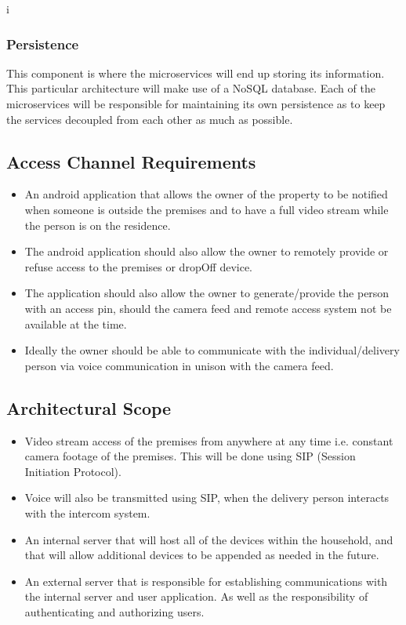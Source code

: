 i\documentclass[a4paper,12pt]{article}
\begin{document}
	\subsubsection{Persistence}
	This component is where the microservices will end up storing its information. This particular architecture will make use of a NoSQL database. Each of the microservices will be responsible for maintaining its own persistence as to keep the services decoupled from each other as much as possible.
	
	\subsection{Access Channel Requirements}
	\begin{itemize}
		\item An android application that allows the owner of the property to be notified when someone is outside the premises and to have a full video stream while the person is on the residence.
		
		\item The android application should also allow the owner to remotely provide or refuse access to the premises or dropOff device.
		
		\item The application should also allow the owner to generate/provide the person with an access pin, should the camera feed and remote access system not be available at the time.  
		
		\item Ideally the owner should be able to communicate with the individual/delivery person via voice communication in unison with the camera feed. 
	\end{itemize}
	
	\newpage
	\subsection{Architectural Scope}
	\begin{itemize}
		\item Video stream access of the premises from anywhere at any time i.e. constant camera footage of the premises. This will be done using SIP (Session Initiation Protocol).
		
		\item Voice will also be transmitted using SIP, when the delivery person interacts with the intercom system.
		
		\item An internal server that will host all of the devices within the household, and that will allow additional devices to be appended as needed in the future.
		
		\item An external server that is responsible for establishing communications with the internal server and user application. As well as the responsibility of authenticating and authorizing users. 
	\end{itemize}
	
\end{document}
